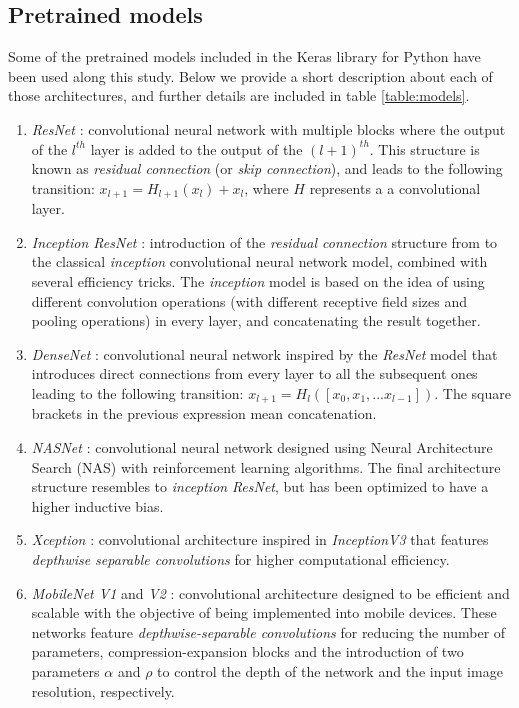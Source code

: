 \documentclass{elsarticle}
\begin{document}
    \subsection{Pretrained models}
    Some of the pretrained models included in the Keras library for Python \citep{chollet2015keras} have been used along this study. Below we provide a short description about each of those architectures, and further details are included in table \ref{table:models}.
    
    \begin{enumerate}
    	\item \textit{ResNet} \citep{he2016}: convolutional neural network with multiple blocks where the output of the $l^{th}$ layer is added to the output of the $(l+1)^{th}$. This structure is known as \textit{residual connection} (or \textit{skip connection}), and leads to the following transition: $x_{l+1} = H_{l+1}(x_{l}) + x_l$, where $H$ represents a a convolutional layer.
    	\item \textit{Inception ResNet} \citep{szegedy2017}: introduction of the \textit{residual connection} structure from \citep{he2016} to the classical \textit{inception} convolutional neural network model, combined with several efficiency tricks. The \textit{inception} model is based on the idea of using different convolution operations (with different receptive field sizes and pooling operations) in every layer, and concatenating the result together. 
    	\item \textit{DenseNet} \citep{huang2017}: convolutional neural network inspired by the \textit{ResNet} model \citep{he2016} that introduces direct connections from every layer to all the subsequent ones leading to the following transition: $x_{l+1} = H_l([x_0, x_1, ... x_{l-1}])$. The square brackets in the previous expression mean concatenation. 
    	\item \textit{NASNet} \citep{pham2018}: convolutional neural network designed using Neural Architecture Search (NAS) with reinforcement learning algorithms. The final architecture structure resembles to \textit{inception} \textit{ResNet}, but has been optimized to have a higher inductive bias.
    	\item \textit{Xception} \citep{chollet2017}: convolutional architecture inspired in \textit{InceptionV3}  \citep{szegedy2016} that features \textit{depthwise separable convolutions} for higher computational efficiency.
    	\item \textit{MobileNet V1} and \textit{V2} \citep{howard2017, sandler2018}: convolutional architecture designed to be efficient and scalable with the objective of being implemented into mobile devices. These networks feature \textit{depthwise-separable convolutions} for reducing the number of parameters, compression-expansion blocks and the introduction of two parameters $\alpha$ and $\rho$ to control the depth of the network and the input image resolution, respectively.

\end{enumerate}
\end{document}
